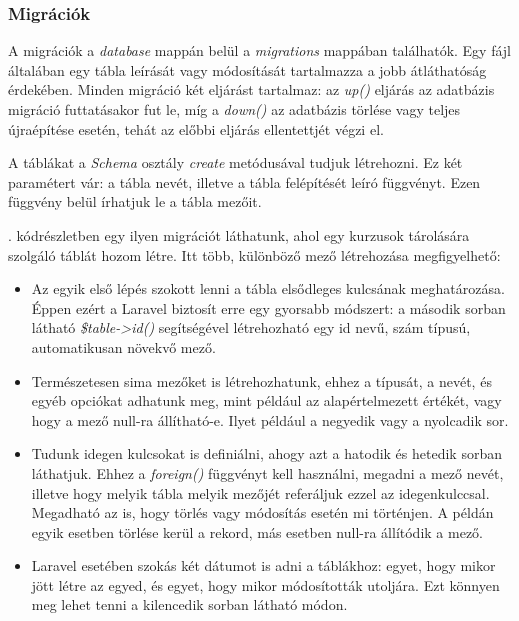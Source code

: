\documentclass[
]{thesis-ekf}
\theoremstyle{definition}
\theoremstyle{remark}
\begin{document}
\subsubsection{Migrációk}

A migrációk a \emph{database} mappán belül a \emph{migrations} mappában találhatók. Egy fájl általában egy tábla leírását vagy módosítását tartalmazza a jobb átláthatóság érdekében. Minden migráció két eljárást tartalmaz: az \emph{up()} eljárás az adatbázis migráció futtatásakor fut le, míg a \emph{down()} az adatbázis törlése vagy teljes újraépítése esetén, tehát az előbbi eljárás ellentettjét végzi el.\cite{migrations}

A táblákat a \emph{Schema} osztály \emph{create} metódusával tudjuk létrehozni. Ez két paramétert vár: a tábla nevét, illetve a tábla felépítését leíró függvényt. Ezen függvény belül írhatjuk le a tábla mezőit.

. kódrészletben egy ilyen migrációt láthatunk, ahol egy kurzusok tárolására szolgáló táblát hozom létre. Itt több, különböző mező létrehozása megfigyelhető:
\begin{itemize}
	\item Az egyik első lépés szokott lenni a tábla elsődleges kulcsának meghatározása. Éppen ezért a Laravel biztosít erre egy gyorsabb módszert: a második sorban látható \emph{\$table->id()} segítségével létrehozható egy id nevű, szám típusú, automatikusan növekvő mező.
	\item Természetesen sima mezőket is létrehozhatunk, ehhez a típusát, a nevét, és egyéb opciókat adhatunk meg, mint például az alapértelmezett értékét, vagy hogy a mező null-ra állítható-e. Ilyet például a negyedik vagy a nyolcadik sor.
	\item Tudunk idegen kulcsokat is definiálni, ahogy azt a hatodik és hetedik sorban láthatjuk. Ehhez a \emph{foreign()} függvényt kell használni, megadni a mező nevét, illetve hogy melyik tábla melyik mezőjét referáljuk ezzel az idegenkulccsal. Megadható az is, hogy törlés vagy módosítás esetén mi történjen. A példán egyik esetben törlése kerül a rekord, más esetben null-ra állítódik a mező.
	\item Laravel esetében szokás két dátumot is adni a táblákhoz: egyet, hogy mikor jött létre az egyed, és egyet, hogy mikor módosították utoljára. Ezt könnyen meg lehet tenni a kilencedik sorban látható módon.
\end{itemize}


\end{document}
